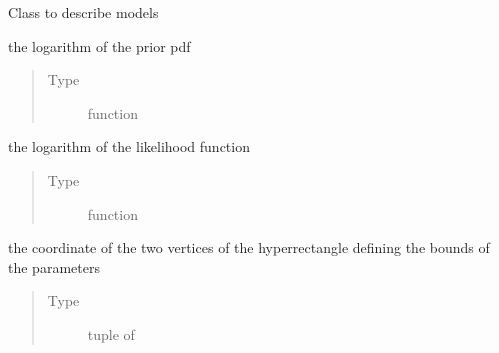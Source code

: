 \documentclass[letterpaper,10pt,english,openany,oneside]{sphinxmanual}
\begin{document}
\begin{fulllineitems}
\label{\detokenize{autogen:model.Model}}
Class to describe models

\begin{fulllineitems}
\label{\detokenize{autogen:model.Model.log_prior}}
the logarithm of the prior pdf
\begin{quote}\begin{description}
\item[{Type}] \leavevmode
function

\end{description}\end{quote}

\end{fulllineitems}


\begin{fulllineitems}
\label{\detokenize{autogen:model.Model.log_likelihood}}
the logarithm of the likelihood function
\begin{quote}\begin{description}
\item[{Type}] \leavevmode
function

\end{description}\end{quote}

\end{fulllineitems}


\begin{fulllineitems}
\label{\detokenize{autogen:model.Model.space_bounds}}
the coordinate of the two vertices of the hyperrectangle
defining the bounds of the parameters
\begin{quote}\begin{description}
\item[{Type}] \sphinxhyphen{}tuple of 


\end{description}
\end{quote}
\end{fulllineitems}
\end{fulllineitems}
\end{document}
